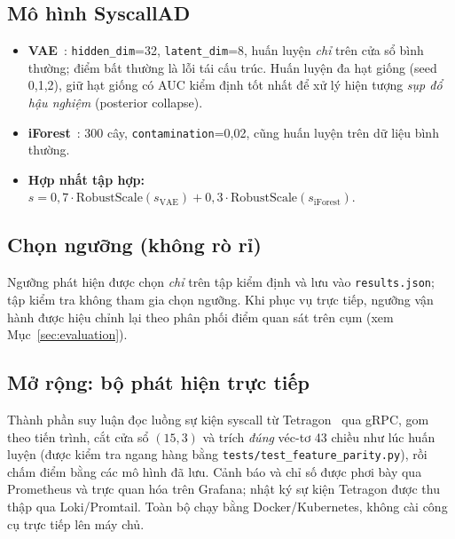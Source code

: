 \subsection{Mô hình SyscallAD}
\begin{itemize}[leftmargin=1.6em]
  \item \textbf{VAE}~\cite{vae_kingma}: \texttt{hidden\_dim}=32, \texttt{latent\_dim}=8,
        huấn luyện \emph{chỉ} trên cửa sổ bình thường; điểm bất thường là lỗi tái
        cấu trúc. Huấn luyện đa hạt giống (seed 0,1,2), giữ hạt giống có AUC kiểm
        định tốt nhất để xử lý hiện tượng \emph{sụp đổ hậu nghiệm} (posterior
        collapse).
  \item \textbf{iForest}~\cite{iforest_liu}: 300 cây, \texttt{contamination}=0{,}02,
        cũng huấn luyện trên dữ liệu bình thường.
  \item \textbf{Hợp nhất tập hợp:}
        $s = 0{,}7\cdot\mathrm{RobustScale}(s_\text{VAE}) + 0{,}3\cdot\mathrm{RobustScale}(s_\text{iForest})$.
\end{itemize}

\subsection{Chọn ngưỡng (không rò rỉ)}
Ngưỡng phát hiện được chọn \emph{chỉ} trên tập kiểm định và lưu vào
\texttt{results.json}; tập kiểm tra không tham gia chọn ngưỡng. Khi phục vụ trực
tiếp, ngưỡng vận hành được hiệu chỉnh lại theo phân phối điểm quan sát trên cụm
(xem Mục~\ref{sec:evaluation}).

\subsection{Mở rộng: bộ phát hiện trực tiếp}
Thành phần suy luận đọc luồng sự kiện syscall từ Tetragon~\cite{tetragon} qua gRPC,
gom theo tiến trình, cắt cửa sổ $(15,3)$ và trích \emph{đúng} véc-tơ 43 chiều như
lúc huấn luyện (được kiểm tra ngang hàng bằng \texttt{tests/test\_feature\_parity.py}),
rồi chấm điểm bằng các mô hình đã lưu. Cảnh báo và chỉ số được phơi bày qua
Prometheus và trực quan hóa trên Grafana; nhật ký sự kiện Tetragon được thu thập
qua Loki/Promtail. Toàn bộ chạy bằng Docker/Kubernetes, không cài công cụ trực
tiếp lên máy chủ.
